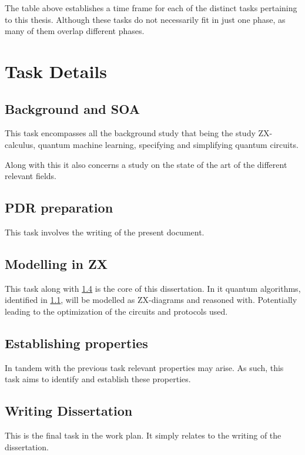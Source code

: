 The table above establishes a time frame for each of the distinct tasks pertaining to this thesis. Although these tasks do not necessarily fit in just one phase, as many of them overlap different phases.

\section{Task Details}
\subsection{Background and SOA}
\label{back-soa}
This task encompasses all the background study that being the study ZX-calculus, quantum machine learning, specifying and simplifying quantum circuits.

Along with this it also concerns a study on the state of the art of the different relevant fields.

\subsection{PDR preparation}

This task involves the writing of the present document.

\subsection{Modelling in ZX}

This task along with \ref{Est. prop} is the core of this dissertation. In it quantum algorithms, identified in \ref{back-soa}, will be modelled as ZX-diagrams and reasoned with. Potentially leading to the optimization of the circuits and protocols used. 

\subsection{Establishing properties}
\label{Est. prop}

In tandem with the previous task relevant properties may arise. As such, this task aims to identify and establish these properties.


\subsection{Writing Dissertation}

This is the final task in the work plan. It simply relates to the writing of the dissertation.

